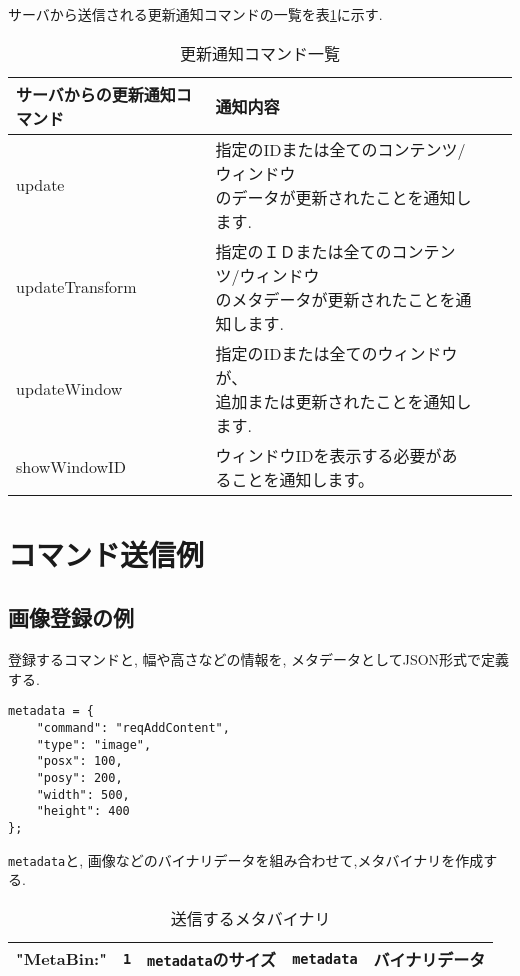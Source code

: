 \documentclass[a4paper,10pt,oneside]{jsbook}
\begin{document}
サーバから送信される更新通知コマンドの一覧を表\ref{responsecommands}に示す.

\begin{table}[htbp]
\begin{center}
\caption{更新通知コマンド一覧}
\label{responsecommands}
\begin{tabular}{|l|l|l|l|}
\hline
サーバからの更新通知コマンド	  & 通知内容 \\
\hline
\hline
update & \shortstack[l]{指定のIDまたは全てのコンテンツ/ウィンドウ \\ のデータが更新されたことを通知します.} \\
\hline
updateTransform & \shortstack[l]{指定のＩＤまたは全てのコンテンツ/ウィンドウ\\のメタデータが更新されたことを通知します.} \\
\hline
updateWindow & \shortstack[l]{指定のIDまたは全てのウィンドウが、\\ 追加または更新されたことを通知します.} \\
\hline
showWindowID & ウィンドウIDを表示する必要があることを通知します。\\
\hline

\end{tabular}
\end{center}
\end{table}

\section{コマンド送信例}
\subsection{画像登録の例}

登録するコマンドと, 幅や高さなどの情報を, メタデータとしてJSON形式で定義する.

\begin{verbatim}
metadata = {
    "command": "reqAddContent", 
    "type": "image", 
    "posx": 100, 
    "posy": 200, 
    "width": 500,
    "height": 400 
};
\end{verbatim}

\verb+metadata+と, 画像などのバイナリデータを組み合わせて,メタバイナリを作成する. 

\begin{table}[htbp]
\begin{center}
\caption{送信するメタバイナリ}
\label{sendmetabin}
\begin{tabular}{|l|l|l|l|l|}
\hline
"MetaBin:" & \verb+1+ & \verb+metadata+のサイズ & \verb+metadata+ & バイナリデータ \\
\hline

\end{tabular}
\end{center}
\end{table}
\end{document}
